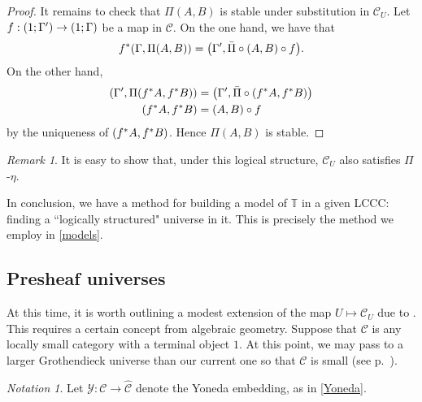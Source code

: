 \documentclass[10pt,letterpaper,cm]{nupset}
\theoremstyle{definition}
\theoremstyle{theorem}
\theoremstyle{remark}
\newtheorem{remark}[definition]{Remark}
\newtheorem*{notation}{Notation}
\newcommand{\0}{\mathbf{0}}
\newcommand{\1}{\mathbf{1}}
\newcommand{\2}{\mathbf{2}}
\renewcommand{\c}{\mathscr{C}}
\newcommand{\T}{\mathbb T}
\begin{document}
\begin{proof}
It remains to check that $\Pi(A,B)$  is stable under substitution in $\c_U$. Let $f: \mleft(1; \Gamma'\mright) \to \mleft(1; \Gamma\mright)$ be a map in $\c$. On the one hand, we have that $$f^{\ast}(\Gamma, \Pi(A, B)) = \mleft(\Gamma', \bar{\Pi} \circ  \mleft(A, B\mright) \circ f\mright).$$ On the other hand, 
\begin{align*}
\mleft(\Gamma', \Pi(f^{\ast}{A}, f^{\ast}{B})\mright) & = \mleft(\Gamma', \bar{\Pi}\circ \mleft(f^{\ast}{A},f^{\ast}{B}\mright) \mright)
\\ \mleft(f^{\ast}{A},f^{\ast}{B}\mright)& =  \mleft(A, B\mright) \circ f 
\end{align*}
by the uniqueness of $\mleft(f^{\ast}{A},f^{\ast}{B}\mright)$. Hence $\Pi(A,B)$ is stable.
\end{proof}

\begin{remark}
It is easy to show that, under this logical structure, $\c_U$ also satisfies $\Pi$-$\eta$.
\end{remark}

\medskip

In conclusion, we have a method for building a model of $\T$ in a given LCCC: finding a ``logically structured" universe in it. This is precisely the method we employ in \cref{models}.


\subsection{Presheaf universes}\label{PrUn}

At this time, it is worth outlining a modest extension of the map $U \mapsto \c_{U}$ due to \cite{Nat}. This requires a certain concept from algebraic geometry. Suppose that $\c$ is any locally small category with a terminal object $1$. At this point, we may pass to a larger Grothendieck universe than our current one so that $\c$ is small (see p.~\pageref{ssetsmall}).

\begin{notation}
Let $\mathcal{Y}: \c \to \widehat{\c}$ denote the Yoneda embedding, as in \cref{Yoneda}.
\end{notation}
\end{document}
